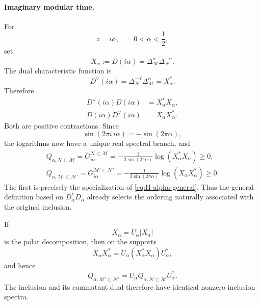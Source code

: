\documentclass[a4paper,11pt]{article}
\theoremstyle{definition}
\newcommand{\mN}{\mathcal{N}}
\newcommand{\mM}{\mathcal{M}}
\begin{document}
\paragraph{Imaginary modular time.}
For
\begin{equation}
    z=i\alpha,
    \qquad
    0<\alpha<\frac12,
\end{equation}
set
\begin{equation}
    X_\alpha
    :=
    D(i\alpha)
    =
    \overline{
    \Delta_{\mM}^\alpha
    \Delta_{\mN}^{-\alpha}} .
    \label{eq:X-alpha-common}
\end{equation}
The dual characteristic function is
\begin{equation}
    D^\vee(i\alpha)
    =
    \overline{
    \Delta_{\mN}^{-\alpha}
    \Delta_{\mM}^\alpha}
    =
    X_\alpha^* .
    \label{eq:Ddual-alpha-common}
\end{equation}
Therefore
\begin{align}
    D^\vee(i\alpha)D(i\alpha)
    &=
    X_\alpha^*X_\alpha,
    \label{eq:XX-original}
    \\
    D(i\alpha)D^\vee(i\alpha)
    &=
    X_\alpha X_\alpha^* .
    \label{eq:XX-dual}
\end{align}
Both are positive contractions. Since
\begin{equation}
    \sin(2\pi i\,i\alpha)
    =
    -\sin(2\pi\alpha),
\end{equation}
the logarithms now have a unique real spectral branch, and
\begin{align}
    \boxed{
    Q_{\alpha,\mN\subset\mM}
    =
    G_{i\alpha}^{\mN\subset\mM}
    =
    -\frac{1}{2\sin(2\pi\alpha)}
    \log(X_\alpha^*X_\alpha)
    \geq0,
    }
    \label{eq:Halpha-original-common}
    \\
    \boxed{
    Q_{\alpha,\mM'\subset\mN'}
    =
    G_{i\alpha}^{\mM'\subset\mN'}
    =
    -\frac{1}{2\sin(2\pi\alpha)}
    \log(X_\alpha X_\alpha^*)
    \geq0.
    }
    \label{eq:Halpha-dual-common}
\end{align}
The first is precisely the specialization of
\eqref{eq:H-alpha-general}. Thus the general definition based on
$D_\alpha^*D_\alpha$ already selects the ordering naturally associated with
the original inclusion.

If
\begin{equation}
    X_\alpha
    =
    U_\alpha|X_\alpha|
\end{equation}
is the polar decomposition, then on the supports
\begin{equation}
    X_\alpha X_\alpha^*
    =
    U_\alpha
    (X_\alpha^*X_\alpha)
    U_\alpha^*,
\end{equation}
and hence
\begin{equation}
    \boxed{
    Q_{\alpha,\mM'\subset\mN'}
    =
    U_\alpha
    Q_{\alpha,\mN\subset\mM}
    U_\alpha^* .
    }
    \label{eq:H-dual-polar}
\end{equation}
The inclusion and its commutant dual therefore have identical nonzero
inclusion spectra.
\end{document}
